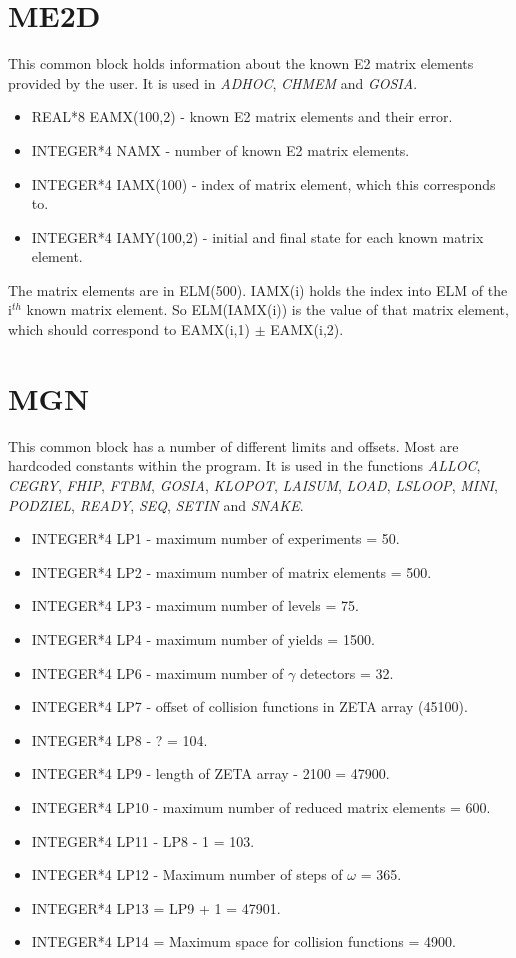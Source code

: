 \section{ME2D}

This common block holds information about the known E2 matrix elements
provided by the user. It is used in {\em ADHOC}, {\em CHMEM} and {\em
GOSIA}.

\begin{itemize}
\item REAL*8 EAMX(100,2) - known E2 matrix elements and their error.
\item INTEGER*4 NAMX - number of known E2 matrix elements.
\item INTEGER*4 IAMX(100) - index of matrix element, which this corresponds
to.
\item INTEGER*4 IAMY(100,2) - initial and final state for each known matrix
element.
\end{itemize}

The matrix elements are in ELM(500). IAMX(i) holds the index into ELM of the
i$^{th}$ known matrix element. So ELM(IAMX(i)) is the value of that matrix
element, which should correspond to EAMX(i,1) $\pm$ EAMX(i,2).

\section{MGN}

This common block has a number of different limits and offsets. Most are
hardcoded constants within the program. It is used in the functions {\em
ALLOC}, {\em CEGRY}, {\em FHIP}, {\em FTBM}, {\em GOSIA}, {\em KLOPOT}, {\em
LAISUM}, {\em LOAD}, {\em LSLOOP}, {\em MINI}, {\em PODZIEL}, {\em READY},
{\em SEQ}, {\em SETIN} and {\em SNAKE}.

\begin{itemize}
\item INTEGER*4 LP1 - maximum number of experiments = 50.
\item INTEGER*4 LP2 - maximum number of matrix elements = 500.
\item INTEGER*4 LP3 - maximum number of levels = 75.
\item INTEGER*4 LP4 - maximum number of yields = 1500.
\item INTEGER*4 LP6 - maximum number of $\gamma$ detectors = 32.
\item INTEGER*4 LP7 - offset of collision functions in ZETA array (45100).
\item INTEGER*4 LP8 - ? = 104.
\item INTEGER*4 LP9 - length of ZETA array - 2100 = 47900.
\item INTEGER*4 LP10 - maximum number of reduced matrix elements = 600.
\item INTEGER*4 LP11 - LP8 - 1 = 103.
\item INTEGER*4 LP12 - Maximum number of steps of $\omega$ = 365.
\item INTEGER*4 LP13 = LP9 + 1 = 47901.
\item INTEGER*4 LP14 = Maximum space for collision functions = 4900.
\end{itemize}

